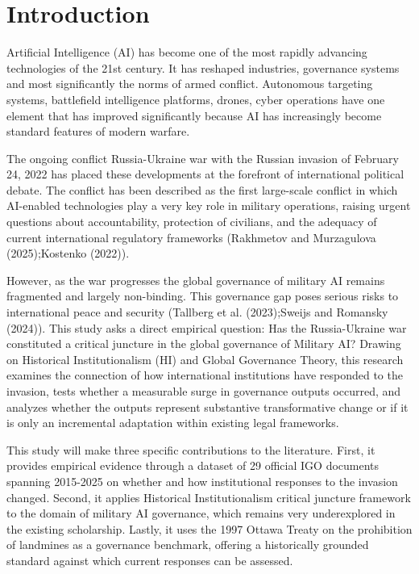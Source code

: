 \documentclass[
  12pt,
]{article}
\begin{document}
\section{Introduction}\label{introduction}

Artificial Intelligence (AI) has become one of the most rapidly
advancing technologies of the 21st century. It has reshaped industries,
governance systems and most significantly the norms of armed conflict.
Autonomous targeting systems, battlefield intelligence platforms,
drones, cyber operations have one element that has improved
significantly because AI has increasingly become standard features of
modern warfare.

The ongoing conflict Russia-Ukraine war with the Russian invasion of
February 24, 2022 has placed these developments at the forefront of
international political debate. The conflict has been described as the
first large-scale conflict in which AI-enabled technologies play a very
key role in military operations, raising urgent questions about
accountability, protection of civilians, and the adequacy of current
international regulatory frameworks (Rakhmetov and Murzagulova
(2025);Kostenko (2022)).

However, as the war progresses the global governance of military AI
remains fragmented and largely non-binding. This governance gap poses
serious risks to international peace and security (Tallberg et al.
(2023);Sweijs and Romansky (2024)). This study asks a direct empirical
question: Has the Russia-Ukraine war constituted a critical juncture in
the global governance of Military AI? Drawing on Historical
Institutionalism (HI) and Global Governance Theory, this research
examines the connection of how international institutions have responded
to the invasion, tests whether a measurable surge in governance outputs
occurred, and analyzes whether the outputs represent substantive
transformative change or if it is only an incremental adaptation within
existing legal frameworks.

This study will make three specific contributions to the literature.
First, it provides empirical evidence through a dataset of 29 official
IGO documents spanning 2015-2025 on whether and how institutional
responses to the invasion changed. Second, it applies Historical
Institutionalism critical juncture framework to the domain of military
AI governance, which remains very underexplored in the existing
scholarship. Lastly, it uses the 1997 Ottawa Treaty on the prohibition
of landmines as a governance benchmark, offering a historically grounded
standard against which current responses can be assessed.
\end{document}
